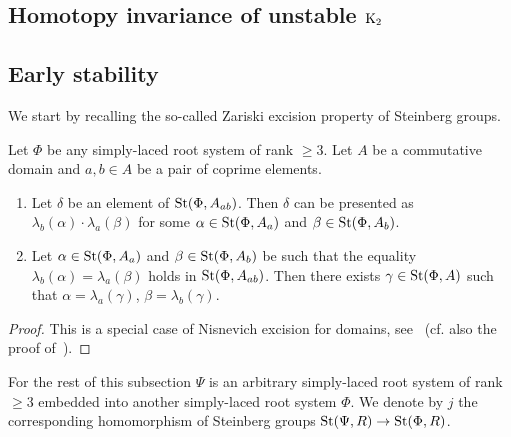 \subsection{Homotopy invariance of unstable $\operatorname{K}_2$}

\subsection{Early stability}
We start by recalling the so-called Zariski excision property of Steinberg groups.
\begin{lemma} \label{lem:zariski-glueing}
Let $\Phi$ be any simply-laced root system of rank $\geq 3$.
Let $A$ be a commutative domain and $a, b \in A$ be a pair of coprime elements.
\begin{enumerate}
    \item Let $\delta$ be an element of $\operatorname{St}(\Phi, A_{ab})$.
    Then $\delta$ can be presented as $\lambda_b(\alpha) \cdot \lambda_a(\beta)$ for some
    $\alpha \in \operatorname{St}(\Phi, A_a)$ and $\beta \in \operatorname{St}(\Phi, A_b)$.
    \item  Let $\alpha \in \operatorname{St}(\Phi, A_a)$ and $\beta \in \operatorname{St}(\Phi, A_b)$ be such that the equality $\lambda_b(\alpha) = \lambda_a(\beta)$ holds in $\operatorname{St}(\Phi, A_{ab})$.
    Then there exists $\gamma \in \operatorname{St}(\Phi, A)$ such that $\alpha = \lambda_a(\gamma)$, $\beta = \lambda_b(\gamma)$.
\end{enumerate}

\end{lemma}
\begin{proof}
    This is a special case of Nisnevich excision for domains, see~\cite[Proposition~4.5]{LSV2}
    (cf. also the proof of~\cite[Lemma~2.6]{LSV2}).
\end{proof}

For the rest of this subsection $\Psi$ is an arbitrary simply-laced root system of rank $\geq 3$
 embedded into another simply-laced root system $\Phi$.
We denote by $j$ the corresponding homomorphism of Steinberg groups $\operatorname{St}(\Psi, R) \to \operatorname{St}(\Phi, R)$.

